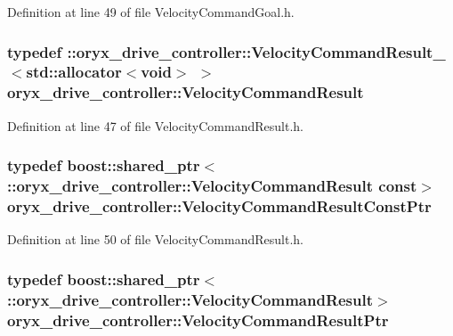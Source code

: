 \-Definition at line 49 of file \-Velocity\-Command\-Goal.\-h.

\subsubsection[{\-Velocity\-Command\-Result}]{\setlength{\rightskip}{0pt plus 5cm}typedef \-::{\bf oryx\-\_\-drive\-\_\-controller\-::\-Velocity\-Command\-Result\-\_\-}$<$std\-::allocator$<$void$>$ $>$ {\bf oryx\-\_\-drive\-\_\-controller\-::\-Velocity\-Command\-Result}}\label{namespaceoryx__drive__controller_a310307a7c17c21218c7744327d0e247a}


\-Definition at line 47 of file \-Velocity\-Command\-Result.\-h.

\subsubsection[{\-Velocity\-Command\-Result\-Const\-Ptr}]{\setlength{\rightskip}{0pt plus 5cm}typedef boost\-::shared\-\_\-ptr$<$ \-::{\bf oryx\-\_\-drive\-\_\-controller\-::\-Velocity\-Command\-Result} const$>$ {\bf oryx\-\_\-drive\-\_\-controller\-::\-Velocity\-Command\-Result\-Const\-Ptr}}\label{namespaceoryx__drive__controller_a1f0c9ac26a41dabd31350e0744277c20}


\-Definition at line 50 of file \-Velocity\-Command\-Result.\-h.

\subsubsection[{\-Velocity\-Command\-Result\-Ptr}]{\setlength{\rightskip}{0pt plus 5cm}typedef boost\-::shared\-\_\-ptr$<$ \-::{\bf oryx\-\_\-drive\-\_\-controller\-::\-Velocity\-Command\-Result}$>$ {\bf oryx\-\_\-drive\-\_\-controller\-::\-Velocity\-Command\-Result\-Ptr}}\label{namespaceoryx__drive__controller_a7229a9fbec192af76432cb499b1da249}


